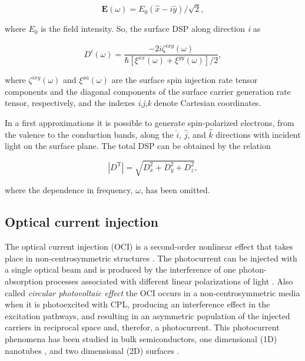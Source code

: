\documentclass[pss]{wiley2sp} %
\begin{document}
\begin{equation*}
    \mathbf{E} (\omega) = E_{0}(\hat{x} -i \hat{y})/\sqrt{2}, 
\end{equation*}


\noindent where $E_{0}$ is the field intensity.
So,  the surface DSP along
direction \emph{i} as

\begin{equation}
    D^{i}(\omega) = \frac{-2i \zeta^{ixy} (\omega)}{\hbar \left[
    \xi^{xx}(\omega) + \xi^{yy}(\omega) \right] /2 } \label{eq:D^i},
\end{equation}

\noindent where $\zeta^{ixy} (\omega)$ and $\xi^{aa}(\omega)$ are the surface
spin injection rate tensor components and the diagonal components of the
surface carrier generation rate tensor, respectively, and the indexes
\emph{i},\emph{j},\emph{k} denote Cartesian coordinates.

 In a first approximations it is 
possible to generate spin-polarized electrons, from the valence to the
conduction bands, along the $\hat{i}$, $\hat{j}$, and $\hat{k}$ directions with
incident light on the surface plane. The total DSP can be obtained by the
relation

\begin{equation}
    \left|{D^{\text{T}}}\right| = \sqrt{  D_{x}^{2} +  D_{y}^{2} +  D_{z}^{2} },
\end{equation}

\noindent where the dependence in frequency, $\omega$, has been omitted.

\subsection{Optical current injection}

The optical current injection (OCI) is a second-order nonlinear effect that takes place in non-centrosymmetric structures \cite{nastos2006optical,cabellos2011optical,bhat2005excitonic,fraser1999quantum}. The photocurrent can be injected with a single optical beam and is produced by the interference of one photon-absorption processes associated with different linear polarizations of light \cite{sipe2000second}. Also called  \emph{circular photovoltaic effect} the OCI occurs in a non-centrosymmetric media when it is photoexcited with CPL, producing an interference effect in the excitation pathways, and resulting in an asymmetric population of the injected carriers in reciprocal space and, therefor, a photocurrent. This photocurrent phenomena has been studied in bulk semiconductors, one dimensional (1D) nanotubes
\cite{mele2000coherent,kral2000photogalvanic}, and two dimensional (2D) surfaces \cite{mele2000coherent}.
\end{document}
